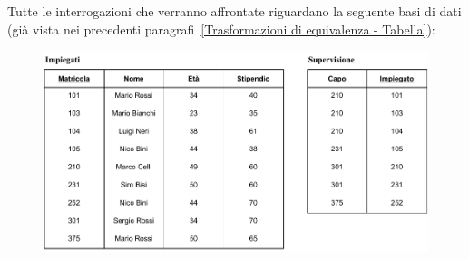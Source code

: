 \documentclass[a4paper]{article}
\begin{document}
	Tutte le interrogazioni che verranno affrontate riguardano la seguente basi di dati (già vista nei precedenti paragrafi~\ref{Trasformazioni di equivalenza - Tabella}):
	\begin{figure}[!htp]
		\centering
		\includegraphics[width=\textwidth]{img/equivalenza_espressioni_algebriche.pdf}
	\end{figure}
\end{document}

